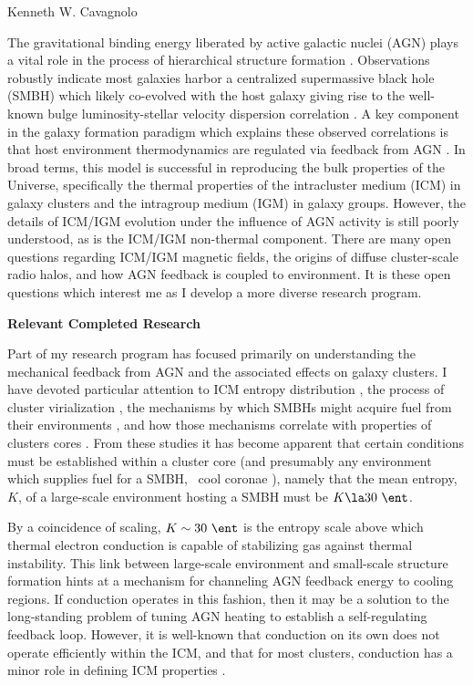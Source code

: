 \documentclass[12pt]{article}
\begin{document}
\doublespacing
\begin{center}Kenneth W. Cavagnolo\end{center}
The gravitational binding energy liberated by active galactic nuclei
(AGN) plays a vital role in the process of hierarchical structure
formation \cite[\eg][]{perseus1, croton06, bower06, saro06, sijacki07,
  birzan08}. Observations robustly indicate most galaxies harbor a
centralized supermassive black hole (SMBH) which likely co-evolved
with the host galaxy giving rise to the well-known bulge
luminosity-stellar velocity dispersion correlation
\cite{1995ARA&A..33..581K, magorrian}. A key component in the galaxy
formation paradigm which explains these observed correlations is that
host environment thermodynamics are regulated via feedback from AGN
\cite{2002MNRAS.333..145N, mcnamrev}. In broad terms, this model is
successful in reproducing the bulk properties of the Universe,
specifically the thermal properties of the intracluster medium (ICM)
in galaxy clusters and the intragroup medium (IGM) in galaxy
groups. However, the details of ICM/IGM evolution under the influence
of AGN activity is still poorly understood, as is the ICM/IGM
non-thermal component. There are many open questions regarding ICM/IGM
magnetic fields, the origins of diffuse cluster-scale radio halos, and
how AGN feedback is coupled to environment. It is these open questions
which interest me as I develop a more diverse research program.

{\bf{Relevant Completed Research}}

Part of my research program has focused primarily on understanding the
mechanical feedback from AGN and the associated effects on galaxy
clusters. I have devoted particular attention to ICM entropy
distribution \cite{accept}, the process of cluster virialization
\cite{xrayband}, the mechanisms by which SMBHs might acquire fuel from
their environments \cite{conduction}, and how those mechanisms
correlate with properties of clusters cores \cite{haradent}. From
these studies it has become apparent that certain conditions must be
established within a cluster core (and presumably any environment
which supplies fuel for a SMBH, \eg\ cool coronae \cite{coronae}),
namely that the mean entropy, $K$, of a large-scale environment
hosting a SMBH must be $K \la 30~\ent$.

By a coincidence of scaling, $K \sim 30~\ent$ is the entropy scale
above which thermal electron conduction is capable of stabilizing gas
against thermal instability. This link between large-scale environment
and small-scale structure formation hints at a mechanism for
channeling AGN feedback energy to cooling regions. If conduction
operates in this fashion, then it may be a solution to the
long-standing problem of tuning AGN heating to establish a
self-regulating feedback loop. However, it is well-known that
conduction on its own does not operate efficiently within the ICM, and
that for most clusters, conduction has a minor role in defining ICM
properties \cite{2001ApJ...562L.129N, 2002ApJ...581..223R,
  2004MNRAS.347.1130V, dunn08}.
\end{document}
